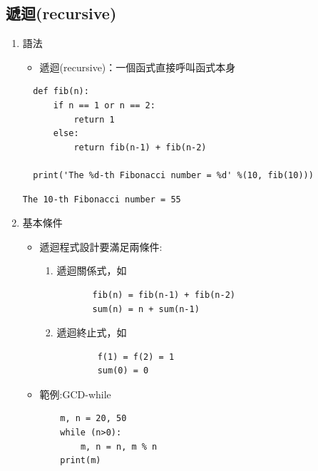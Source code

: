 \documentclass[a4paper,12pt]{article}
\begin{document}
\subsection{遞迴(recursive)}
\label{sec:orgc28e92f}
\begin{enumerate}
\item 語法
\label{sec:org1646289}
\begin{itemize}
\item 遞迴(recursive)：一個函式直接呼叫函式本身\\
\end{itemize}
\lstset{breaklines=true,language=Python,label= ,caption= ,captionpos=b,firstnumber=1,numbers=left}
\begin{lstlisting}
  def fib(n):
      if n == 1 or n == 2:
          return 1
      else:
          return fib(n-1) + fib(n-2)

  print('The %d-th Fibonacci number = %d' %(10, fib(10)))
\end{lstlisting}

\begin{verbatim}
The 10-th Fibonacci number = 55
\end{verbatim}

\item 基本條件
\label{sec:orgee3832a}
\begin{itemize}
\item 遞迴程式設計要滿足兩條件:\\
\begin{enumerate}
\item 遞迴關係式，如\\
\lstset{breaklines=true,language=Python,label= ,caption= ,captionpos=b,firstnumber=1,numbers=left}
\begin{lstlisting}
       fib(n) = fib(n-1) + fib(n-2)
       sum(n) = n + sum(n-1) 
\end{lstlisting}
\item 遞迴終止式，如\\
\lstset{breaklines=true,language=Python,label= ,caption= ,captionpos=b,firstnumber=1,numbers=left}
\begin{lstlisting}
        f(1) = f(2) = 1
        sum(0) = 0
\end{lstlisting}
\end{enumerate}
\item 範例:GCD-while\\
\lstset{breaklines=true,language=Python,label= ,caption= ,captionpos=b,firstnumber=1,numbers=left}
\begin{lstlisting}
    m, n = 20, 50
    while (n>0):
        m, n = n, m % n
    print(m)
\end{lstlisting}


\end{itemize}
\end{enumerate}
\end{document}
